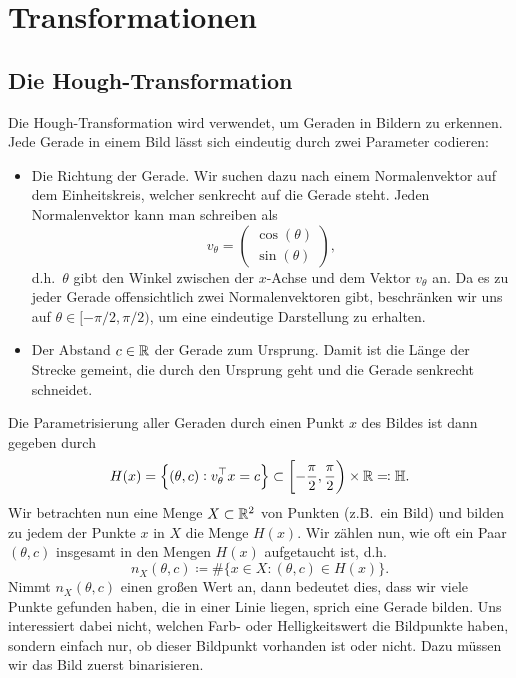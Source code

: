 \chapter{Transformationen}

\section{Die Hough-Transformation}

Die Hough-Transformation wird verwendet, um Geraden in Bildern zu erkennen. Jede Gerade in einem 
Bild lässt sich eindeutig durch zwei Parameter codieren:
\begin{itemize}
\item Die Richtung der Gerade. Wir suchen dazu nach einem Normalenvektor auf dem Einheitskreis, 
  welcher senkrecht auf die Gerade steht. Jeden Normalenvektor kann man schreiben als
  \[
    v_{\theta} = \begin{pmatrix} \cos(\theta) \\ \sin(\theta) \end{pmatrix},
  \]
  d.h.\ $ \theta $ gibt den Winkel zwischen der $ x $-Achse und dem Vektor $ v_{\theta} $ an. Da es
  zu jeder Gerade offensichtlich zwei Normalenvektoren gibt, beschränken wir uns auf
  $ \theta \in [-\pi / 2, \pi / 2) $, um eine eindeutige Darstellung zu erhalten.
\item Der Abstand $ c \in \mathbb{R} $ der Gerade zum Ursprung. Damit ist die Länge der Strecke gemeint, 
  die durch den Ursprung geht und die Gerade senkrecht schneidet.
\end{itemize}
Die Parametrisierung aller Geraden durch einen Punkt $ x $ des Bildes ist dann gegeben durch
\[
  H(x) = \left\{ 
    (\theta, c) : v_{\theta}^{\top} x = c
  \right\} \subset \left[ -\frac{\pi}{2}, \frac{\pi}{2} \right) \times \mathbb{R} \eqqcolon \mathbb{H}.
\]
Wir betrachten nun eine Menge $ X \subset \mathbb{R}^{2} $ von Punkten (z.B.\ ein Bild) und bilden zu jedem 
der Punkte $ x $ in $ X $ die Menge $ H(x) $. Wir zählen nun, wie oft ein Paar $ (\theta, c) $
insgesamt in den Mengen $ H(x) $ aufgetaucht ist, d.h.\
\[
  n_{X}(\theta, c) \coloneqq \#\{ x \in X : (\theta, c) \in H(x) \}.
\]
Nimmt $ n_{X}(\theta, c) $ einen großen Wert an, dann bedeutet dies, dass wir viele Punkte gefunden
haben, die in einer Linie liegen, sprich eine Gerade bilden. Uns interessiert dabei nicht, welchen
Farb- oder Helligkeitswert die Bildpunkte haben, sondern einfach nur, ob dieser Bildpunkt vorhanden
ist oder nicht. Dazu müssen wir das Bild zuerst binarisieren.

